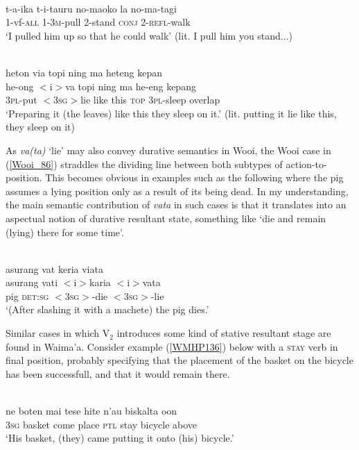 \ea \label{Tobelo_20}
\\
\gll t-a-ika t-i-tauru no-maoko la no-ma-tagi \\
1-vf-\textsc{all} 1-3\textsc{m}-pull 2-stand \textsc{conj} 2-\textsc{refl}-walk \\
\glft `I pulled him up so that he could walk' (lit. I pull him you stand...)\\ 
\z

\ea \label{Wooi_86}
\\
\glll heton via topi ning ma heteng kepan \\
he-ong $<$i$>$va topi ning ma he-eng kepang \\
3\textsc{pl}-put $<$3\textsc{sg}$>$lie like this \textsc{top} 3\textsc{pl}-sleep overlap \\
\glft `Preparing it (the leaves) like this they sleep on it.' (lit. putting it lie like this, they sleep on it) \\ 
\z

As \textit{va(ta)} `lie' may also convey durative semantics in Wooi, the Wooi case in (\ref{Wooi_86}) straddles the dividing line between both subtypes of action-to-position. This becomes obvious in examples such as the following where the pig assumes a lying position only as a result of its being dead. In my understanding, the main semantic contribution of \textit{vata} in such cases is that it translates into an aspectual notion of durative resultant state, something like `die and remain (lying) there for some time'.

\ea \label{}
\\
\glll asurang vat keria viata \\
asurang vati $<$i$>$karia $<$i$>$vata \\
pig \textsc{det}:\textsc{sg} $<$3\textsc{sg}$>$-die $<$3\textsc{sg}$>$-lie \\
\glft `(After slashing it with a machete) the pig dies.'\\ 
\z

Similar cases in which V$_2$ introduces some kind of stative resultant stage are found in Waima'a. Consider example (\ref{WMHP136}) below with a \textsc{stay} verb in final position, probably specifying that the placement of the basket on the bicycle has been successfull, and that it would remain there.

\ea \label{WMHP136}
\\
\gll ne boten mai tese hite n'au biskalta oon \\
\textsc{3}\textsc{sg} basket come place \textsc{ptl} stay bicycle above \\
\glft `His basket, (they) came putting it onto (his) bicycle.' \\ 
\z


